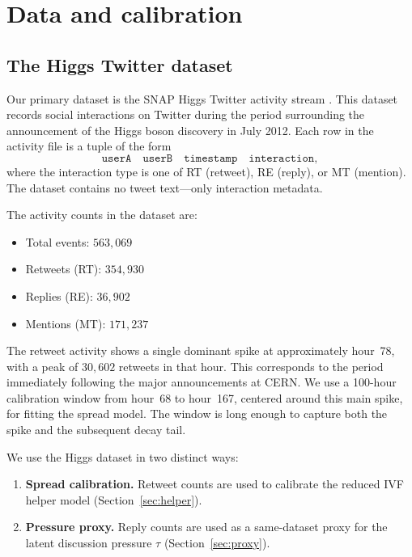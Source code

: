 \documentclass[11pt]{article}
\begin{document}
\section{Data and calibration}
\label{sec:data}

\subsection{The Higgs Twitter dataset}

Our primary dataset is the SNAP Higgs Twitter activity stream \cite{snap, domenico2013}. This dataset records social interactions on Twitter during the period surrounding the announcement of the Higgs boson discovery in July 2012. Each row in the activity file is a tuple of the form
\[
\texttt{userA}\quad \texttt{userB}\quad \texttt{timestamp}\quad \texttt{interaction},
\]
where the interaction type is one of RT (retweet), RE (reply), or MT (mention). The dataset contains no tweet text---only interaction metadata.

The activity counts in the dataset are:
\begin{itemize}[leftmargin=1.5em]
    \item Total events: $563{,}069$
    \item Retweets (RT): $354{,}930$
    \item Replies (RE): $36{,}902$
    \item Mentions (MT): $171{,}237$
\end{itemize}

The retweet activity shows a single dominant spike at approximately hour~78, with a peak of $30{,}602$ retweets in that hour. This corresponds to the period immediately following the major announcements at CERN. We use a 100-hour calibration window from hour~68 to hour~167, centered around this main spike, for fitting the spread model. The window is long enough to capture both the spike and the subsequent decay tail.

We use the Higgs dataset in two distinct ways:
\begin{enumerate}[leftmargin=1.5em]
    \item \textbf{Spread calibration.} Retweet counts are used to calibrate the reduced IVF helper model (Section~\ref{sec:helper}).
    \item \textbf{Pressure proxy.} Reply counts are used as a same-dataset proxy for the latent discussion pressure $\tau$ (Section~\ref{sec:proxy}).
\end{enumerate}
\end{document}
